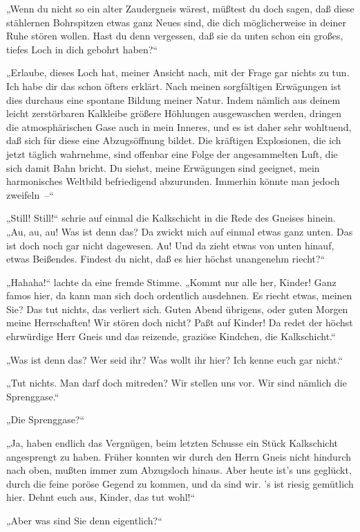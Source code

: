 „Wenn du nicht so ein alter Zaudergneis wärest, müßtest du doch
sagen, daß diese stählernen Bohrspitzen etwas ganz Neues sind, die
dich möglicherweise in deiner Ruhe stören wollen. Hast du denn
vergessen, daß sie da unten schon ein großes, tiefes Loch in dich
gebohrt haben?“

„Erlaube, dieses Loch hat, meiner Ansicht nach, mit der Frage gar
nichts zu tun. Ich habe dir das schon öfters erklärt. Nach meinen
sorgfältigen Erwägungen ist dies durchaus eine spontane Bildung
meiner Natur. Indem nämlich aus deinem leicht zerstörbaren
Kalkleibe größere Höhlungen ausgewaschen werden, dringen die
atmosphärischen Gase auch in mein Inneres, und es ist daher sehr
wohltuend, daß sich für diese eine Abzugsöffnung bildet. Die
kräftigen Explosionen, die ich jetzt täglich wahrnehme, sind
offenbar eine Folge der angesammelten Luft, die sich damit Bahn
bricht. Du siehst, meine Erwägungen sind geeignet, mein
harmonisches Weltbild befriedigend abzurunden. Immerhin könnte man
jedoch zweifeln~–“

„Still! Still!“ schrie auf einmal die Kalkschicht in die Rede des
Gneises hinein. „Au, au, au! Was ist denn das? Da zwickt mich auf
einmal etwas ganz unten. Das ist doch noch gar nicht dagewesen. Au!
Und da zieht etwas von unten hinauf, etwas Beißendes. Findest du
nicht, daß es hier höchst unangenehm riecht?“

„Hahaha!“ lachte da eine fremde Stimme. „Kommt nur alle her,
Kinder! Ganz famos hier, da kann man sich doch ordentlich
ausdehnen. Es riecht etwas, meinen Sie? Das tut nichts, das
verliert sich. Guten Abend übrigens, oder guten Morgen meine
Herrschaften! Wir stören doch nicht? Paßt auf Kinder! Da redet der
höchst ehrwürdige Herr Gneis und das reizende, graziöse Kindchen,
die Kalkschicht.“

„Was ist denn das? Wer seid ihr? Was wollt ihr hier? Ich kenne euch
gar nicht.“

„Tut nichts. Man darf doch mitreden? Wir stellen uns vor. Wir sind
nämlich die Sprenggase.“

„Die Sprenggase?“

„Ja, haben endlich das Vergnügen, beim letzten Schusse ein Stück
Kalkschicht angesprengt zu haben. Früher konnten wir durch den
Herrn Gneis nicht hindurch nach oben, mußten immer zum Abzugsloch
hinaus. Aber heute ist's uns geglückt, durch die feine poröse
Gegend zu kommen, und da sind wir. 's ist riesig gemütlich hier.
Dehnt euch aus, Kinder, das tut wohl!“

„Aber was sind Sie denn eigentlich?“

